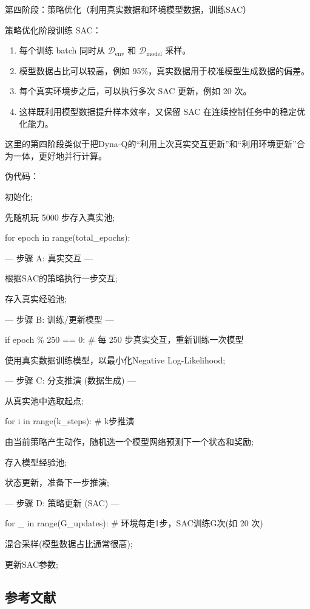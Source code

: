 第四阶段：策略优化（利用真实数据和环境模型数据，训练SAC）

策略优化阶段训练 SAC：

\begin{enumerate}
\def\labelenumi{\arabic{enumi}.}
\tightlist
\item
  每个训练 batch 同时从 \(\mathcal D_{\mathrm{env}}\) 和 \(\mathcal D_{\mathrm{model}}\) 采样。
\item
  模型数据占比可以较高，例如 95\%，真实数据用于校准模型生成数据的偏差。
\item
  每个真实环境步之后，可以执行多次 SAC 更新，例如 20 次。
\item
  这样既利用模型数据提升样本效率，又保留 SAC 在连续控制任务中的稳定优化能力。
\end{enumerate}

这里的第四阶段类似于把Dyna-Q的``利用上次真实交互更新''和``利用环境更新''合为一体，更好地并行计算。

伪代码：

初始化;

先随机玩 5000 步存入真实池;

for epoch in range(total\_epochs):

--- 步骤 A: 真实交互 ---

根据SAC的策略执行一步交互;

存入真实经验池;

--- 步骤 B: 训练/更新模型 ---

if epoch \% 250 == 0: \# 每 250 步真实交互，重新训练一次模型

使用真实数据训练模型，以最小化Negative Log-Likelihood;

--- 步骤 C: 分支推演 (数据生成) ---

从真实池中选取起点;

for i in range(k\_steps): \# k步推演

由当前策略产生动作，随机选一个模型网络预测下一个状态和奖励;

存入模型经验池;

状态更新，准备下一步推演;

--- 步骤 D: 策略更新 (SAC) ---

for \_ in range(G\_updates): \# 环境每走1步，SAC训练G次(如 20 次)

混合采样(模型数据占比通常很高);

更新SAC参数;

\hypertarget{ux53c2ux8003ux6587ux732e-61}{%
\subsection{参考文献}\label{ux53c2ux8003ux6587ux732e-61}}

